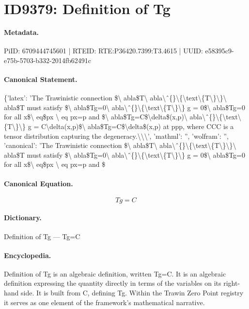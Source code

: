 \section*{ID9379: Definition of Tg}
\paragraph{Metadata.}
PiID: 6709444745601 | RTEID: RTE:P36420.7399:T3.4615 | UUID: e58395c9-e75b-5703-b332-2014fb62491c

\paragraph{Canonical Statement.}
\{'latex': 'The Trawinistic connection \$\textbackslash{} abla\$T\textbackslash{} abla\textbackslash{}ˆ\{\}\textbackslash{}\{\textbackslash{}text\textbackslash{}\{T\textbackslash{}\}\textbackslash{}\}\textbackslash{} abla\$T must satisfy \$\textbackslash{} abla\$Tg=0\textbackslash{} abla\textbackslash{}ˆ\{\}\textbackslash{}\{\textbackslash{}text\textbackslash{}\{T\textbackslash{}\}\textbackslash{}\} g = 0\$\textbackslash{} abla\$Tg=0 for all x\$\textbackslash{} eq\$px \textbackslash{} eq px=p and \$\textbackslash{} abla\$Tg=C\$\textbackslash{}delta\$(x,p)\textbackslash{} abla\textbackslash{}ˆ\{\}\textbackslash{}\{\textbackslash{}text\textbackslash{}\{T\textbackslash{}\}\textbackslash{}\} g = C\textbackslash{}delta(x,p)\$\textbackslash{} abla\$Tg=C\$\textbackslash{}delta\$(x,p) at ppp, where CCC is a tensor distribution capturing the degeneracy.\textbackslash{}\textbackslash{}\textbackslash{}', 'mathml': '', 'wolfram': '', 'canonical': 'The Trawinistic connection \$\textbackslash{} abla\$T\textbackslash{} abla\textbackslash{}ˆ\{\}\textbackslash{}\{\textbackslash{}text\textbackslash{}\{T\textbackslash{}\}\textbackslash{}\}\textbackslash{} abla\$T must satisfy \$\textbackslash{} abla\$Tg=0\textbackslash{} abla\textbackslash{}ˆ\{\}\textbackslash{}\{\textbackslash{}text\textbackslash{}\{T\textbackslash{}\}\textbackslash{}\} g = 0\$\textbackslash{} abla\$Tg=0 for all x\$\textbackslash{} eq\$px \textbackslash{} eq px=p and \$

\paragraph{Canonical Equation.}
\[
Tg=C
\]

\paragraph{Dictionary.}
Definition of Tg — Tg=C

\paragraph{Encyclopedia.}
Definition of Tg is an algebraic definition, written Tg=C. It is an algebraic definition expressing the quantity directly in terms of the variables on its right-hand side. It is built from C, defining Tg. Within the Trawin Zero Point registry it serves as one element of the framework's mathematical narrative.
